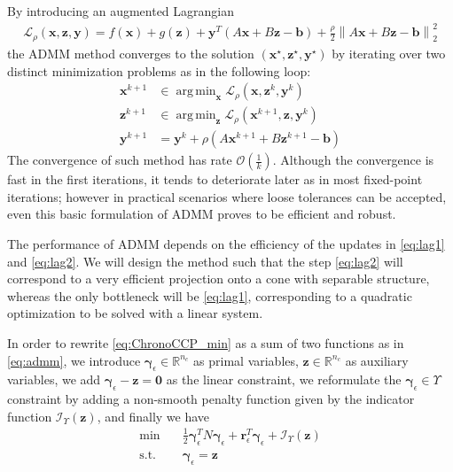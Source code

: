 \documentclass[final,3p]{elsarticle}
\newcommand{\vect}[1]{\bm{#1}}
\newcommand{\norm}[1]{\left\lVert#1\right\rVert}
\DeclareMathOperator*{\argmin}{arg\,min} %
\begin{document}
By introducing an augmented Lagrangian
\begin{align}
\mathcal{L}_{\rho}(\vect{x},\vect{z},\vect{y})= f(\vect{x}) + g(\vect{z}) + \vect{y}^T (A \vect{x} + B \vect{z} - \vect{b}) + \frac{\rho}{2} \norm{A \vect{x} + B \vect{z} - \vect{b}}_2^2
\end{align}
the ADMM method converges to the solution $(\vect{x}^\star,\vect{z}^\star,\vect{y}^\star)$ by iterating over two distinct minimization problems as in the following loop:
\begin{align}
 \vect{x}^{k+1} &\in \argmin_{\vect{x}} \mathcal{L}_{\rho}(\vect{x},\vect{z}^k,\vect{y}^k) \label{eq:lag1}\\
 \vect{z}^{k+1} &\in \argmin_{\vect{z}} \mathcal{L}_{\rho}(\vect{x}^{k+1},\vect{z},\vect{y}^k) \label{eq:lag2}\\
 \vect{y}^{k+1} &= \vect{y}^{k} + \rho ( A \vect{x}^{k+1} + B \vect{z}^{k+1} - \vect{b} )
 \label{eq:admm_iters}
\end{align}
The convergence of such method has rate $\mathcal{O}\left(\frac{1}{k}\right)$.
Although the convergence is fast in the first iterations, it tends to deteriorate later as in most fixed-point iterations; however in practical scenarios where loose tolerances can be accepted, even this basic formulation of ADMM proves to be efficient and robust.

The performance of ADMM depends on the efficiency of the updates in \eqref{eq:lag1} and \eqref{eq:lag2}. We will design the method such that the step \eqref{eq:lag2} will correspond to a very efficient projection onto a cone with separable structure, whereas the only bottleneck will be \eqref{eq:lag1}, corresponding to a quadratic optimization to be solved with a linear system.


In order to rewrite \eqref{eq:ChronoCCP_min} as a sum of two functions as in \eqref{eq:admm}, we introduce 
$\vect{\gamma}_\epsilon \in \mathbb{R}^{n_c}$ as primal variables, 
$\vect{z} \in \mathbb{R}^{n_c}$ as auxiliary variables, 
we add $\vect{\gamma}_\epsilon - \vect{z} = \vect{0}$ as the linear constraint, 
we reformulate the $\vect{\gamma}_\epsilon \in \Upsilon$ constraint by adding a non-smooth penalty function given by the indicator function 
$\mathcal{I}_\Upsilon (\vect{z})$,
and finally we have
\begin{subequations}
	\begin{align}
    \text{min} \quad & \frac{1}{2} \vect{\gamma}_\epsilon^T N \vect{\gamma}_\epsilon + \vect{r}^T_\epsilon \vect{\gamma}_\epsilon  
		+  \mathcal{I}_\Upsilon(\vect{z})  \\
	  \text{s.t.} \quad & \vect{\gamma}_\epsilon =  \vect{z}
	\end{align}
	\label{eq:admm_mod}
\end{subequations}
\end{document}
